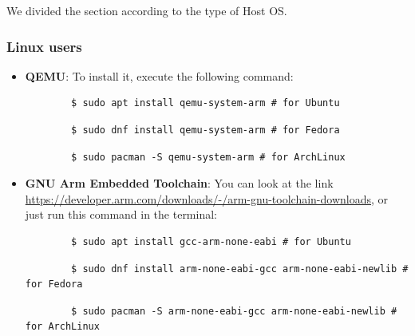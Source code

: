 We divided the section according to the type of Host OS.

\subsubsection{ Linux users} \label{sec:LinuxUsers}

\begin{itemize}

    
    \item \textbf{QEMU}: To install it, execute the following command:
    \begin{verbatim}
        $ sudo apt install qemu-system-arm # for Ubuntu
    \end{verbatim}
     \begin{verbatim}
        $ sudo dnf install qemu-system-arm # for Fedora
    \end{verbatim}
     \begin{verbatim}
        $ sudo pacman -S qemu-system-arm # for ArchLinux
    \end{verbatim}

    \item \textbf{GNU Arm Embedded Toolchain}: You can look at the link \url{https://developer.arm.com/downloads/-/arm-gnu-toolchain-downloads}, or just run this command in the terminal:
    \begin{verbatim}
        $ sudo apt install gcc-arm-none-eabi # for Ubuntu
    \end{verbatim}
    \begin{verbatim}
        $ sudo dnf install arm-none-eabi-gcc arm-none-eabi-newlib # for Fedora
    \end{verbatim}
    \begin{verbatim}
        $ sudo pacman -S arm-none-eabi-gcc arm-none-eabi-newlib # for ArchLinux
    \end{verbatim}


\end{itemize}
